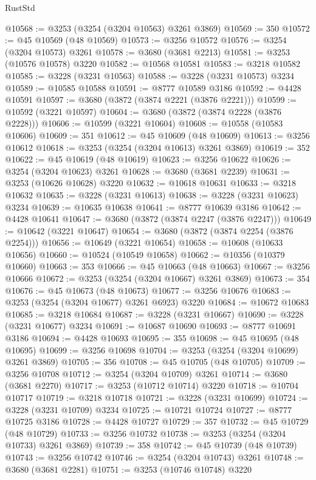 \begin{lexlean}{RustStd}
\begin{coremodule}
@10568 := @3253 (@3254 (@3204 @10563) @3261 @3869)
@10569 := 350
@10572 := @45 @10569 (@48 @10569)
@10573 := @3256 @10572
@10576 := @3254 (@3204 @10573) @3261
@10578 := @3680 (@3681 @2213)
@10581 := @3253 (@10576 @10578) @3220
@10582 := @10568 @10581
@10583 := @3218 @10582
@10585 := @3228 (@3231 @10563)
@10588 := @3228 (@3231 @10573) @3234
@10589 := @10585 @10588
@10591 := @8777 @10589 @3186
@10592 := @4428 @10591
@10597 := @3680 (@3872 (@3874 @2221 (@3876 @2221)))
@10599 := @10592 (@3221 @10597)
@10604 := @3680 (@3872 (@3874 @2228 (@3876 @2228)))
@10606 := @10599 (@3221 @10604)
@10608 := @10558 (@10583 @10606)
@10609 := 351
@10612 := @45 @10609 (@48 @10609)
@10613 := @3256 @10612
@10618 := @3253 (@3254 (@3204 @10613) @3261 @3869)
@10619 := 352
@10622 := @45 @10619 (@48 @10619)
@10623 := @3256 @10622
@10626 := @3254 (@3204 @10623) @3261
@10628 := @3680 (@3681 @2239)
@10631 := @3253 (@10626 @10628) @3220
@10632 := @10618 @10631
@10633 := @3218 @10632
@10635 := @3228 (@3231 @10613)
@10638 := @3228 (@3231 @10623) @3234
@10639 := @10635 @10638
@10641 := @8777 @10639 @3186
@10642 := @4428 @10641
@10647 := @3680 (@3872 (@3874 @2247 (@3876 @2247)))
@10649 := @10642 (@3221 @10647)
@10654 := @3680 (@3872 (@3874 @2254 (@3876 @2254)))
@10656 := @10649 (@3221 @10654)
@10658 := @10608 (@10633 @10656)
@10660 := @10524 (@10549 @10658)
@10662 := @10356 (@10379 @10660)
@10663 := 353
@10666 := @45 @10663 (@48 @10663)
@10667 := @3256 @10666
@10672 := @3253 (@3254 (@3204 @10667) @3261 @3869)
@10673 := 354
@10676 := @45 @10673 (@48 @10673)
@10677 := @3256 @10676
@10683 := @3253 (@3254 (@3204 @10677) @3261 @6923) @3220
@10684 := @10672 @10683
@10685 := @3218 @10684
@10687 := @3228 (@3231 @10667)
@10690 := @3228 (@3231 @10677) @3234
@10691 := @10687 @10690
@10693 := @8777 @10691 @3186
@10694 := @4428 @10693
@10695 := 355
@10698 := @45 @10695 (@48 @10695)
@10699 := @3256 @10698
@10704 := @3253 (@3254 (@3204 @10699) @3261 @3869)
@10705 := 356
@10708 := @45 @10705 (@48 @10705)
@10709 := @3256 @10708
@10712 := @3254 (@3204 @10709) @3261
@10714 := @3680 (@3681 @2270)
@10717 := @3253 (@10712 @10714) @3220
@10718 := @10704 @10717
@10719 := @3218 @10718
@10721 := @3228 (@3231 @10699)
@10724 := @3228 (@3231 @10709) @3234
@10725 := @10721 @10724
@10727 := @8777 @10725 @3186
@10728 := @4428 @10727
@10729 := 357
@10732 := @45 @10729 (@48 @10729)
@10733 := @3256 @10732
@10738 := @3253 (@3254 (@3204 @10733) @3261 @3869)
@10739 := 358
@10742 := @45 @10739 (@48 @10739)
@10743 := @3256 @10742
@10746 := @3254 (@3204 @10743) @3261
@10748 := @3680 (@3681 @2281)
@10751 := @3253 (@10746 @10748) @3220

\end{coremodule}
\end{lexlean}
